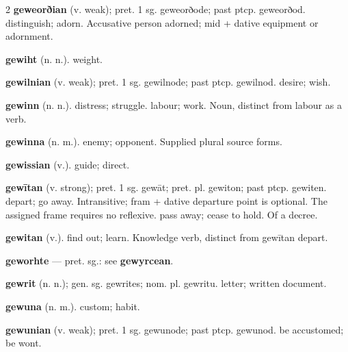 \begin{multicols*}{2}
\textbf{geweorðian} (v. weak); pret. 1 sg. geweorðode; past ptcp. geweorðod. distinguish; adorn. Accusative person adorned; mid + dative equipment or adornment.\par
\textbf{gewiht} (n. n.). weight.\par
\textbf{gewilnian} (v. weak); pret. 1 sg. gewilnode; past ptcp. gewilnod. desire; wish.\par
\textbf{gewinn} (n. n.). distress; struggle. labour; work. Noun, distinct from labour as a verb.\par
\textbf{gewinna} (n. m.). enemy; opponent. Supplied plural source forms.\par
\textbf{gewissian} (v.). guide; direct.\par
\textbf{gewītan} (v. strong); pret. 1 sg. gewāt; pret. pl. gewiton; past ptcp. gewiten. depart; go away. Intransitive; fram + dative departure point is optional. The assigned frame requires no reflexive. pass away; cease to hold. Of a decree.\par
\textbf{gewitan} (v.). find out; learn. Knowledge verb, distinct from gewītan depart.\par
\textbf{geworhte} — pret. sg.: see \textbf{gewyrcean}.\par
\textbf{gewrit} (n. n.); gen. sg. gewrites; nom. pl. gewritu. letter; written document.\par
\textbf{gewuna} (n. m.). custom; habit.\par
\textbf{gewunian} (v. weak); pret. 1 sg. gewunode; past ptcp. gewunod. be accustomed; be wont.\par

\end{multicols*}
